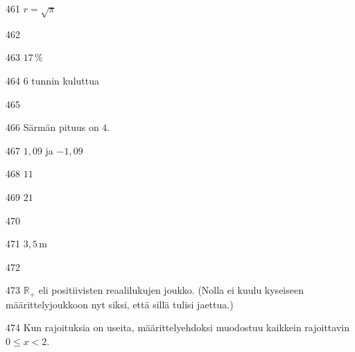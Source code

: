 \begin{Vastaus}{461}
	$r=\sqrt{\pi}$
	
\end{Vastaus}
\begin{Vastaus}{462}
	
\end{Vastaus}
\begin{Vastaus}{463}
		 $17\,\%$
		
\end{Vastaus}
\begin{Vastaus}{464}
	$6$ tunnin kuluttua
	
\end{Vastaus}
\begin{Vastaus}{465}
\end{Vastaus}
\begin{Vastaus}{466}
Särmän pituus on $4$.
\end{Vastaus}
\begin{Vastaus}{467}
	$1,09$ ja $-1,09$
	
\end{Vastaus}
\begin{Vastaus}{468}
	$11$
	
\end{Vastaus}
\begin{Vastaus}{469}
	$21$
	
\end{Vastaus}
\begin{Vastaus}{470}
	
\end{Vastaus}
\begin{Vastaus}{471}
	$3,5$\,m
	
\end{Vastaus}
\begin{Vastaus}{472}
	
\end{Vastaus}
\begin{Vastaus}{473}
	$\mathbb{R}_+$ eli positiivisten reaalilukujen joukko. (Nolla ei kuulu kyseiseen määrittelyjoukkoon nyt siksi, että sillä tulisi jaettua.)
	
\end{Vastaus}
\begin{Vastaus}{474}
	Kun rajoituksia on useita, määrittelyehdoksi muodostuu kaikkein rajoittavin $0\leq x<2$.
	
\end{Vastaus}
